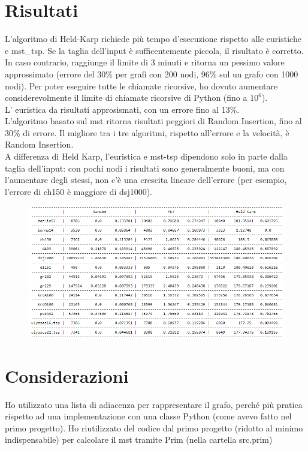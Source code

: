 \documentclass[11pt]{article}
\begin{document}
\section{Risultati}\label{sec:risultati}
    L'algoritmo di Held-Karp richiede più tempo d'esecuzione rispetto alle euristiche e mst\_tsp.
    Se la taglia dell'input è sufficentemente piccola, il risultato è corretto. In caso contrario, raggiunge il limite di 3 minuti e ritorna un pessimo valore approssimato (errore del 30\% per grafi con 200 nodi, 96\% sul un grafo con 1000 nodi).
    Per poter eseguire tutte le chiamate ricorsive, ho dovuto aumentare considerevolmente il limite di chiamate ricorsive di Python (fino a $10^6$).\\
    L' euristica da risultati approsismati, con un errore fino  al 13\%.\\
    L'algoritmo basato sul mst ritorna risultati peggiori di Random Insertion, fino al 30\% di errore.
    Il migliore tra i tre algoritmi, rispetto all'errore e la velocità, è Random Insertion.\\
    A differenza di Held Karp, l'euristica e mst-tsp dipendono solo in parte dalla taglia dell'input: con pochi nodi i risultati sono generalmente buoni, ma con l'aumentare degli stessi, non c'è una crescita lineare dell'errore (per esempio, l'errore di ch150 è maggiore di dsj1000).
\begin{figure}[H]
    \includegraphics[width=1\textwidth]{table.PNG}
\end{figure}
\section{Considerazioni}\label{sec:considerazioni}
    Ho utilizzato una lista di adiacenza per rappresentare il grafo, perché più pratica rispetto ad una implementazione con una classe Python (come avevo fatto nel primo progetto).
    Ho riutilizzato del codice dal primo progetto (ridotto al minimo indispensabile) per calcolare il mst tramite Prim (nella cartella src.prim)\\
\end{document}

